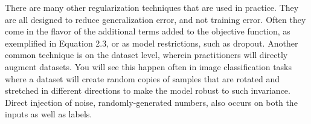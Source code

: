 There are many other regularization techniques that are used in practice. They are all designed to reduce
generalization error, and not training error. Often they come in the flavor of the additional terms added to the
objective function, as exemplified in Equation 2.3, or as model restrictions, such as dropout. Another common technique
is on the dataset level, wherein practitioners will directly augment datasets. You will see this happen often in image classification
tasks where a dataset will create random copies of samples that are rotated and stretched in different directions to make
the model robust to such invariance. Direct injection of noise, randomly-generated numbers, also occurs on both the inputs
as well as labels.
